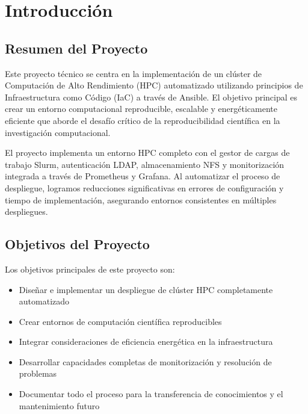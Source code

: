 \documentclass[12pt,a4paper]{report}
\begin{document}
\chapter{Introducción}

\section{Resumen del Proyecto}

\begin{tcolorbox}[
  colback=cientigo-blue!5,
  colframe=cientigo-blue,
  arc=2mm,
  boxrule=0.5pt
]
Este proyecto técnico se centra en la implementación de un clúster de Computación de Alto Rendimiento (HPC) automatizado utilizando principios de Infraestructura como Código (IaC) a través de Ansible. El objetivo principal es crear un entorno computacional reproducible, escalable y energéticamente eficiente que aborde el desafío crítico de la reproducibilidad científica en la investigación computacional.
\end{tcolorbox}

El proyecto implementa un entorno HPC completo con el gestor de cargas de trabajo Slurm, autenticación LDAP, almacenamiento NFS y monitorización integrada a través de Prometheus y Grafana. Al automatizar el proceso de despliegue, logramos reducciones significativas en errores de configuración y tiempo de implementación, asegurando entornos consistentes en múltiples despliegues.

\section{Objetivos del Proyecto}

Los objetivos principales de este proyecto son:

\begin{itemize}
    \item[\textcolor{cientigo-blue}{\faTarget}] Diseñar e implementar un despliegue de clúster HPC completamente automatizado
    \item[\textcolor{cientigo-blue}{\faTarget}] Crear entornos de computación científica reproducibles
    \item[\textcolor{cientigo-blue}{\faTarget}] Integrar consideraciones de eficiencia energética en la infraestructura
    \item[\textcolor{cientigo-blue}{\faTarget}] Desarrollar capacidades completas de monitorización y resolución de problemas
    \item[\textcolor{cientigo-blue}{\faTarget}] Documentar todo el proceso para la transferencia de conocimientos y el mantenimiento futuro
\end{itemize}
\end{document}
